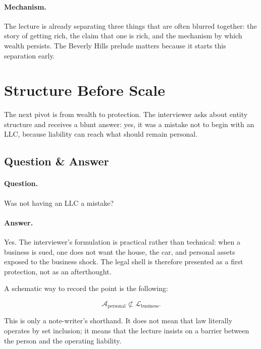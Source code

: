 \paragraph{Mechanism.}
The lecture is already separating three things that are often blurred together: the story of getting rich, the claim that one is rich, and the mechanism by which wealth persists. The Beverly Hills prelude matters because it starts this separation early.

\section{Structure Before Scale}

The next pivot is from wealth to protection. The interviewer asks about entity structure and receives a blunt answer: yes, it was a mistake not to begin with an LLC, because liability can reach what should remain personal.

\subsection{Question \& Answer}

\paragraph{Question.}
Was not having an LLC a mistake?

\paragraph{Answer.}
Yes. The interviewer's formulation is practical rather than technical: when a business is sued, one does not want the house, the car, and personal assets exposed to the business shock. The legal shell is therefore presented as a first protection, not as an afterthought.

A schematic way to record the point is the following:

\begin{equation}
\mathcal{A}_{\mathrm{personal}} \not\subset \mathcal{L}_{\mathrm{business}}.
\end{equation}

This is only a note-writer's shorthand. It does not mean that law literally operates by set inclusion; it means that the lecture insists on a barrier between the person and the operating liability.

